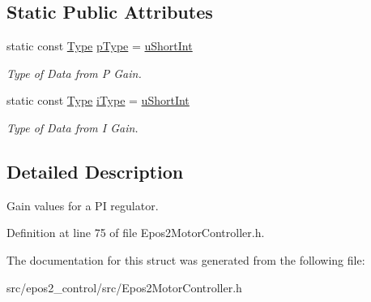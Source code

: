 \subsection*{Static Public Attributes}
\begin{DoxyCompactItemize}
\item 
\hypertarget{structEpos2MotorController_1_1regulatorPI_aedcf6737a00a093909c3208912088490}{static const \hyperlink{classEpos2MotorController_a5404c60266e24bb6c0ce60153ddcb774}{Type} \hyperlink{structEpos2MotorController_1_1regulatorPI_aedcf6737a00a093909c3208912088490}{p\-Type} = \hyperlink{classEpos2MotorController_a5404c60266e24bb6c0ce60153ddcb774a2b4b83649b11351ce20e5f3db7dd19f6}{u\-Short\-Int}}\label{structEpos2MotorController_1_1regulatorPI_aedcf6737a00a093909c3208912088490}

\begin{DoxyCompactList}\small\item\em Type of Data from P Gain. \end{DoxyCompactList}\item 
\hypertarget{structEpos2MotorController_1_1regulatorPI_a537e74125b3f0b4880f2611aa5273608}{static const \hyperlink{classEpos2MotorController_a5404c60266e24bb6c0ce60153ddcb774}{Type} \hyperlink{structEpos2MotorController_1_1regulatorPI_a537e74125b3f0b4880f2611aa5273608}{i\-Type} = \hyperlink{classEpos2MotorController_a5404c60266e24bb6c0ce60153ddcb774a2b4b83649b11351ce20e5f3db7dd19f6}{u\-Short\-Int}}\label{structEpos2MotorController_1_1regulatorPI_a537e74125b3f0b4880f2611aa5273608}

\begin{DoxyCompactList}\small\item\em Type of Data from I Gain. \end{DoxyCompactList}\end{DoxyCompactItemize}


\subsection{Detailed Description}
Gain values for a P\-I regulator. 

Definition at line 75 of file Epos2\-Motor\-Controller.\-h.



The documentation for this struct was generated from the following file\-:\begin{DoxyCompactItemize}
\item 
src/epos2\-\_\-control/src/Epos2\-Motor\-Controller.\-h\end{DoxyCompactItemize}
